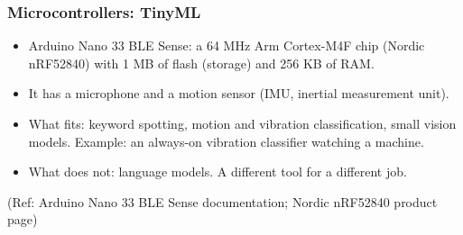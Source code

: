 \begin{frame}[fragile]\frametitle{Microcontrollers: TinyML}
\begin{itemize}
\item Arduino Nano 33 BLE Sense: a 64 MHz Arm Cortex-M4F chip (Nordic nRF52840) with 1 MB of flash (storage) and 256 KB of RAM.
\item It has a microphone and a motion sensor (IMU, inertial measurement unit).
\item What fits: keyword spotting, motion and vibration classification, small vision models. Example: an always-on vibration classifier watching a machine.
\item What does not: language models. A different tool for a different job.
\end{itemize}
{\tiny (Ref: Arduino Nano 33 BLE Sense documentation; Nordic nRF52840 product page)}
\end{frame}

